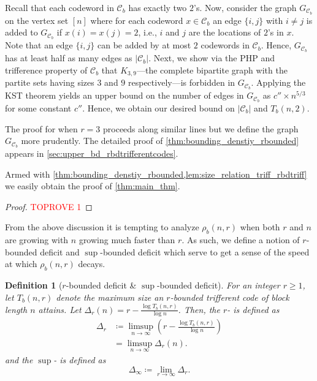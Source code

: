 \documentclass[10pt,a4paper]{article}
\newcommand{\rbdtrifferentcodes}{$r$-bounded trifferent code}
\newcommand{\boundeddeficit}{$r$-bounded deficit}
\newcommand{\limitingdeficit}{$\sup$-bounded deficit}
\newcommand{\calC}{\mathcal{C}}
\newcommand{\define}[1]{\textsb{#1}}
\newcommand{\set}[1]{\{#1\}}
\newtheorem{definition}{Definition}[section]
\DeclareMathOperator{\1}{\mathbf{1}}
\begin{document}
Recall that each codeword in $\calC_b$ has exactly two $2$'s.
Now, consider the graph $G_{\calC_b}$ on the vertex set $[n]$ where for each codeword $x\in \calC_b$ an edge $\set{i,j}$ with $i\neq j$ is added to $G_{\calC_b}$ if $x(i)=x(j)=2$, i.e., $i$ and $j$ are the locations of $2$'s in $x$. Note that an edge $\set{i,j}$ can be added by at most $2$ codewords in $\calC_b$.
Hence, $G_{\calC_b}$ has at least half as many edges as $|\calC_b|$.
Next, we show via the PHP and trifference property of $\calC_b$ that $K_{3,9}$---the complete bipartite graph with the partite sets having sizes $3$ and $9$ respectively---is forbidden in $G_{\calC_b}$.
Applying the KST theorem yields an upper bound on the number of edges in $G_{\calC_b}$ as $c''\times n^{5/3}$ for some constant $c''$.
Hence, we obtain our desired bound on $|\calC_b|$ and $T_b(n,2)$.

The proof for when $r=3$ proceeds along similar lines but we define the graph $G_{\calC_b}$ more prudently.
The detailed proof of \cref{thm:bounding_denstiy_rbounded} appears in \cref{sec:upper_bd_rbdtrifferentcodes}.

Armed with \cref{thm:bounding_denstiy_rbounded,lem:size_relation_triff_rbdtriff} we easily obtain the proof of \cref{thm:main_thm}.

\begin{proof}\textcolor{red}{TOPROVE 1}\end{proof}


From the above discussion it is tempting to analyze $\rho_b(n,r)$ when both $r$ and $n$ are growing with $n$ growing much faster than $r$. As such, we define a notion of \boundeddeficit{} and \limitingdeficit{} which serve to get a sense of the speed at which $\rho_b(n,r)$ decays.

\begin{definition}[\boundeddeficit{} \& ${\sup}$-{bounded deficit}]
	For an integer $r\geq 1$, let $T_b(n,r)$ denote the maximum size an \rbdtrifferentcodes{} of block length $n$ attains. Let $\Delta_r(n) = r-\frac{\log{T_b(n,r)}}{\log{n}}$. Then, the ${r}$-\define{bounded deficit} is defined as
	\begin{align*}
	    \Delta_r&\coloneqq\limsup_{n\to \infty}\left(r-\frac{\log{T_b(n,r)}}{\log{n}}\right)\\
        &= \limsup_{n\to \infty} \Delta_r(n).
	\end{align*}
and the ${\sup}$-\define{bounded deficit} is defined as
	$$
		\Delta_\infty\coloneqq\lim_{r\to \infty}\Delta_r.
	$$ 
\end{definition}
\end{document}
